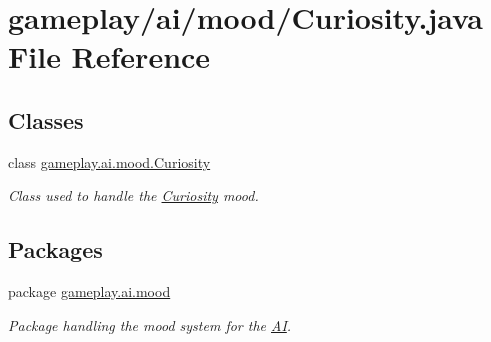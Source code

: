 \hypertarget{a00045}{\section{gameplay/ai/mood/\-Curiosity.java File Reference}
\label{a00045}
}
\subsection*{Classes}
\begin{DoxyCompactItemize}
\item 
class \hyperlink{a00007}{gameplay.\-ai.\-mood.\-Curiosity}
\begin{DoxyCompactList}\small\item\em Class used to handle the \hyperlink{a00007}{Curiosity} mood. \end{DoxyCompactList}\end{DoxyCompactItemize}
\subsection*{Packages}
\begin{DoxyCompactItemize}
\item 
package \hyperlink{a00083}{gameplay.\-ai.\-mood}
\begin{DoxyCompactList}\small\item\em Package handling the mood system for the \hyperlink{a00001}{A\-I}. \end{DoxyCompactList}\end{DoxyCompactItemize}
